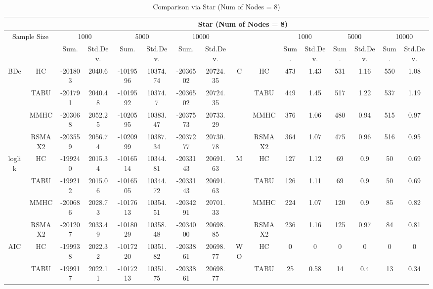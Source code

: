 \begin{table}[p]																										
\centering	\caption{Comparison via Star (Num of Nodes = 8)}	\tiny																						
{\tabcolsep=0.01in																										
\begin{tabular}{cc||cc|cc|cc||cc|cc|cc|cc}																										
\hline																										
&	&	\multicolumn{14}{c}{Star	(Num	of	Nodes	=	8)}\tabularnewline																			
\hline																										
\multicolumn{2}{c||}{Sample	Size}	&	\multicolumn{2}{c|}{1000}	&	\multicolumn{2}{c|}{5000}	&	\multicolumn{2}{c||}{10000}	&	&	&	\multicolumn{2}{c|}{1000}	&	\multicolumn{2}{c|}{5000}	&	\multicolumn{2}{c}{10000}\tabularnewline											
\hline																										
&	&	Sum.	&	Std.Dev.	&	Sum.	&	Std.Dev.	&	Sum.	&	Std.Dev.	&	&	&	Sum.	&	Std.Dev.	&	Sum.	&	Std.Dev.	&	Sum.	&	Std.Dev.\tabularnewline
\hline																										
\hline																										
\multirow{4}{*}{BDe} & HC &	-201803 & 	2040.6 & 	-1019596 & 	10374.74 & 	-2036502 & 	20724.35 & 	\multirow{4}{*}{C} & HC &	473 & 	1.43 & 	531 & 	1.16 & 	550 & 	1.08\tabularnewline													
& TABU &	-201791 & 	2040.48 & 	-1019592 & 	10374.7 & 	-2036502 & 	20724.35 & 	& TABU &	449 & 	1.45 & 	517 & 	1.22 & 	537 & 	1.19\tabularnewline													
& MMHC &	-203068 & 	2052.25 & 	-1020595 & 	10383.47 & 	-2037573 & 	20733.29 & 	& MMHC &	376 & 	1.06 & 	480 & 	0.94 & 	515 & 	0.97\tabularnewline													
& RSMAX2 &	-203559 & 	2056.74 & 	-1020999 & 	10387.34 & 	-2037277 & 	20730.78 & 	& RSMAX2 &	364 & 	1.07 & 	475 & 	0.96 & 	516 & 	0.95\tabularnewline													
\hline																										
\multirow{4}{*}{loglik} & HC &	-199240 & 	2015.34 & 	-1016514 & 	10344.81 & 	-2033143 & 	20691.63 & 	\multirow{4}{*}{M} & HC &	127 & 	1.12 & 	69 & 	0.9 & 	50 & 	0.69\tabularnewline													
& TABU &	-199212 & 	2015.06 & 	-1016505 & 	10344.72 & 	-2033143 & 	20691.63 & 	& TABU &	126 & 	1.11 & 	69 & 	0.9 & 	50 & 	0.69\tabularnewline													
& MMHC &	-200686 & 	2028.73 & 	-1017613 & 	10354.51 & 	-2034291 & 	20701.33 & 	& MMHC &	224 & 	1.07 & 	120 & 	0.9 & 	85 & 	0.82\tabularnewline													
& RSMAX2 &	-201207 & 	2033.49 & 	-1018029 & 	10358.48 & 	-2034000 & 	20698.85 & 	& RSMAX2 &	236 & 	1.16 & 	125 & 	0.97 & 	84 & 	0.81\tabularnewline													
\hline																										
\multirow{4}{*}{AIC} & HC &	-199938 & 	2022.32 & 	-1017220 & 	10351.82 & 	-2033861 & 	20698.77 & 	\multirow{4}{*}{WO} & HC &	0 & 	0 & 	0 & 	0 & 	0 & 	0\tabularnewline													
& TABU &	-199917 & 	2022.11 & 	-1017213 & 	10351.75 & 	-2033861 & 	20698.77 & 	& TABU &	25 & 	0.58 & 	14 & 	0.4 & 	13 & 	0.34\tabularnewline													

\end{tabular}}
\end{table}
